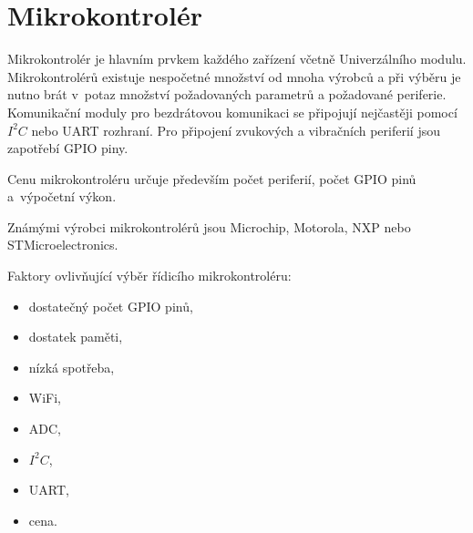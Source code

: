 \section{Mikrokontrolér}
Mikrokontrolér je hlavním prvkem každého zařízení včetně Univerzálního modulu. Mikrokontrolérů existuje nespočetné množství od mnoha výrobců a při výběru je nutno brát v~potaz
množství požadovaných parametrů a požadované periferie. 
Komunikační moduly pro bezdrátovou komunikaci se připojují nejčastěji pomocí $I^2C$ nebo UART rozhraní. Pro připojení zvukových a vibračních periferií jsou zapotřebí 
GPIO piny.

Cenu mikrokontroléru určuje především počet periferií, počet GPIO pinů a~výpočetní výkon.

Známými výrobci mikrokontrolérů jsou Microchip, Motorola, NXP nebo \\STMicroelectronics. 

\newpage
Faktory ovlivňující výběr řídicího mikrokontroléru:
\begin{itemize}
  \item dostatečný počet GPIO pinů,
  \item dostatek paměti,
  \item nízká spotřeba,
  \item WiFi,
  \item ADC,
  \item $I^2C$,
  \item UART,
  \item cena.
\end{itemize}








